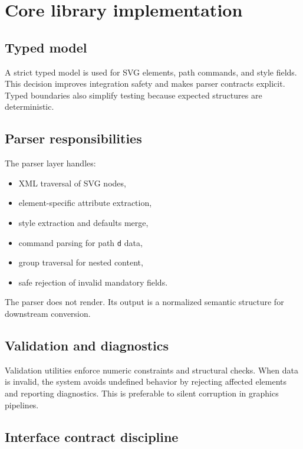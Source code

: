 \section{Core library implementation}

\subsection{Typed model}

A strict typed model is used for SVG elements, path commands, and style fields.
This decision improves integration safety and makes parser contracts explicit.
Typed boundaries also simplify testing because expected structures are deterministic.

\subsection{Parser responsibilities}

The parser layer handles:

\begin{itemize}
\item XML traversal of SVG nodes,
\item element-specific attribute extraction,
\item style extraction and defaults merge,
\item command parsing for path \texttt{d} data,
\item group traversal for nested content,
\item safe rejection of invalid mandatory fields.
\end{itemize}

The parser does not render.
Its output is a normalized semantic structure for downstream conversion.

\subsection{Validation and diagnostics}

Validation utilities enforce numeric constraints and structural checks.
When data is invalid, the system avoids undefined behavior by rejecting affected elements and reporting diagnostics.
This is preferable to silent corruption in graphics pipelines.

\subsection{Interface contract discipline}

